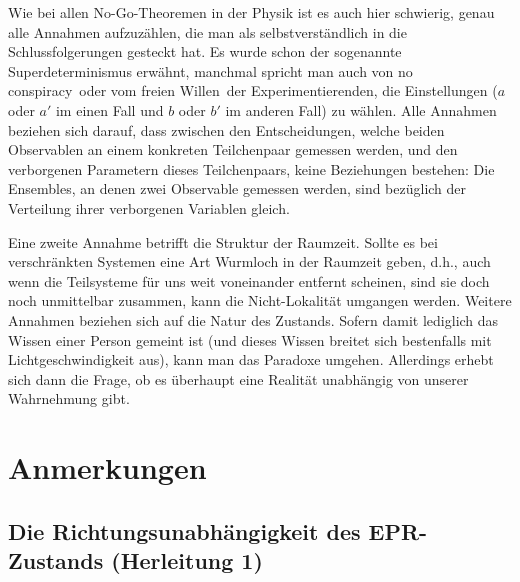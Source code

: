 Wie bei allen No-Go-Theoremen in der Physik ist es auch hier schwierig, genau
alle Annahmen aufzuz\"ahlen, die man als selbstverst\"andlich in die Schlussfolgerungen
gesteckt hat. Es wurde schon der sogenannte Superdeterminismus erw\"ahnt,
manchmal spricht man auch von \glqq no conspiracy\glqq\ oder vom \glqq freien Willen\grqq\
der Experimentierenden, die Einstellungen ($a$ oder $a'$ im einen Fall und $b$ oder $b'$
im anderen Fall) zu w\"ahlen. Alle Annahmen beziehen sich darauf, dass zwischen 
den Entscheidungen, welche beiden Observablen an einem konkreten Teilchenpaar
gemessen werden, und den verborgenen Parametern dieses Teilchenpaars, keine
Beziehungen bestehen: Die Ensembles, an denen zwei Observable gemessen werden,
sind bez\"uglich der Verteilung ihrer verborgenen Variablen gleich. 
 
Eine zweite Annahme betrifft die Struktur der Raumzeit. Sollte es bei verschr\"ankten
Systemen eine Art Wurmloch in der Raumzeit geben, d.h., auch wenn die Teilsysteme
f\"ur uns weit voneinander entfernt scheinen, sind sie doch noch unmittelbar zusammen,
kann die Nicht-Lokalit\"at umgangen werden. Weitere Annahmen beziehen sich auf
die Natur des \glqq Zustands\grqq. Sofern damit lediglich das Wissen einer Person gemeint
ist (und dieses Wissen breitet sich bestenfalls mit Lichtgeschwindigkeit aus), kann man
das Paradoxe umgehen. Allerdings erhebt sich dann die Frage, ob es \"uberhaupt
eine Realit\"at unabh\"angig von unserer Wahrnehmung gibt. 

\section*{Anmerkungen}
\subsection*{Die Richtungsunabh\"angigkeit des EPR-Zustands (Herleitung 1)}
\label{sec_EPR_A}

